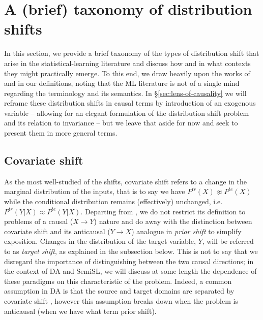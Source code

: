 \section{A (brief) taxonomy of distribution shifts}\label{sec:dist-shift}
In this section, we provide a brief taxonomy of the types of distribution shift that arise in the
statistical-learning literature and discuss how and in what contexts they might practically emerge.
%
To this end, we draw heavily upon the works of \citet{moreno2012unifying} and
\citet{castro2020causality} in our definitions, noting that the \ac{ML} literature is not of a
single mind regarding the terminology and its semantics.
%
In \S\ref{sec:lens-of-causality} we will reframe these distribution shifts in causal terms by
introduction of an exogenous variable -- allowing for an elegant formulation of the distribution
shift problem and its relation to invariance -- but we leave that aside for now and seek to present
them in more general terms.
\subsection{Covariate shift}\label{ssec:covariate-shift}
As the most well-studied of the shifts, covariate shift refers to a change in the marginal
distribution of the inputs, that is to say we have \( P^{tr}(X) \not\approx P^{te}(X) \) while the
conditional distribution remains (effectively) unchanged, i.e. \( P^{tr}(Y|X) \approx P^{te}(Y|X)
\).
%
Departing from \citet{moreno2012unifying}, we do not restrict its definition to problems of a causal
(\( X \to Y\)) nature and do away with the distinction between covariate shift and its anticausal
(\( Y \to X \)) analogue in \emph{prior shift} to simplify exposition.
%
Changes in the distribution of the target variable, \(Y\), will be referred to as \emph{target
shift}, as explained in the subsection below.
%
This is not to say that we disregard the importance of distinguishing between the two causal
directions; in the context of \ac{DA} and \ac{SemiSL}, we will discuss at some length the dependence of these
paradigms on this characteristic of the problem.
%
Indeed, a common assumption in \ac{DA} is that the source and target domains are separated by covariate
shift \citep{david2010impossibility}, however this assumption breaks down when the problem is
anticausal (when we have what \cite{moreno2012unifying} term prior shift).

